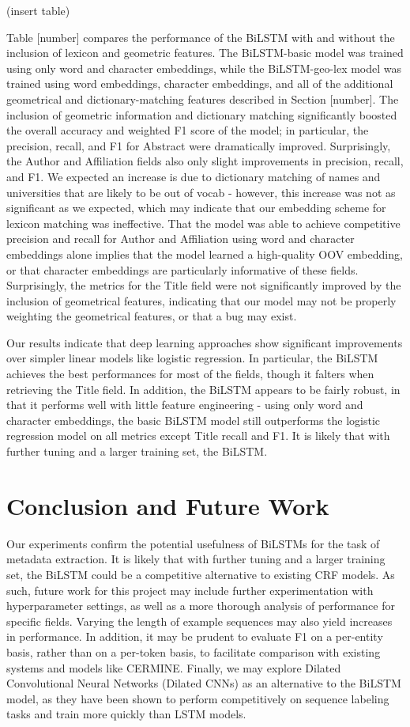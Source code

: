 \documentclass{acm_proc_article-sp}
\begin{document}
(insert table)

Table [number] compares the performance of the BiLSTM with and without the inclusion of lexicon and geometric features. The BiLSTM-basic model was trained using only word and character embeddings, while the BiLSTM-geo-lex model was trained using word embeddings, character embeddings, and all of the additional geometrical and dictionary-matching features described in Section [number]. The inclusion of geometric information and dictionary matching significantly boosted the overall accuracy and weighted F1 score of the model; in particular, the precision, recall, and F1 for Abstract were dramatically improved. Surprisingly, the Author and Affiliation fields also only slight improvements in precision, recall, and F1. We expected an increase is due to dictionary matching of names and universities that are likely to be out of vocab - however, this increase was not as significant as we expected, which may indicate that our embedding scheme for lexicon matching was ineffective. That the model was able to achieve competitive precision and recall for Author and Affiliation using word and character embeddings alone implies that the model learned a high-quality OOV embedding, or that character embeddings are particularly informative of these fields. Surprisingly, the metrics for the Title field were not significantly improved by the inclusion of geometrical features, indicating that our model may not be properly weighting the geometrical features, or that a bug may exist.


Our results indicate that deep learning approaches show significant improvements over simpler linear models like logistic regression. In particular, the BiLSTM achieves the best performances for most of the fields, though it falters when retrieving the Title field. In addition, the BiLSTM appears to be fairly robust, in that it performs well with little feature engineering - using only word and character embeddings, the basic BiLSTM model still outperforms the logistic regression model on all metrics except Title recall and F1. It is likely that with further tuning and a larger training set, the BiLSTM.

\section{Conclusion and Future Work}
Our experiments confirm the potential usefulness of BiLSTMs for the task of metadata extraction. It is likely that with further tuning and a larger training set, the BiLSTM could be a competitive alternative to existing CRF models. As such, future work for this project may include further experimentation with hyperparameter settings, as well as a more thorough analysis of performance for specific fields. Varying the length of example sequences may also yield increases in performance. In addition, it may be prudent to evaluate F1 on a per-entity basis, rather than on a per-token basis, to facilitate comparison with existing systems and models like CERMINE. Finally, we may explore Dilated Convolutional Neural Networks (Dilated CNNs) as an alternative to the BiLSTM model, as they have been shown to perform competitively on sequence labeling tasks and train more quickly than LSTM models. \cite{strubell2017fast}
\end{document}
